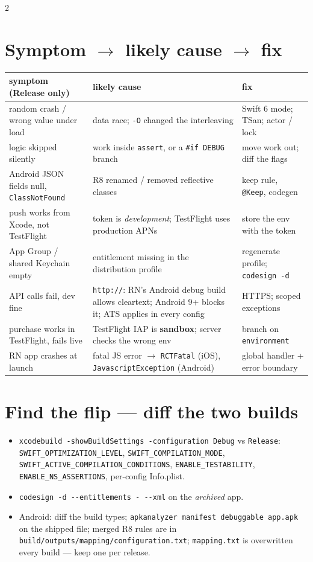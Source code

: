 \documentclass[8pt]{extarticle}
\newcommand\ct[1]{\texttt{#1}}
\newcommand\dd{\hbox{-}\hbox{-}}
\begin{document}
\begin{multicols}{2}
\section{Symptom $\to$ likely cause $\to$ fix}
{\footnotesize\setlength{\tabcolsep}{2.5pt}
\begin{tabular}{@{}>{\raggedright\arraybackslash}p{21mm}>{\raggedright\arraybackslash}p{34mm}>{\raggedright\arraybackslash}p{21mm}@{}}
\toprule
\textbf{symptom (Release only)} & \textbf{likely cause} & \textbf{fix}\\ \midrule
random crash / wrong value under load & data race; \ct{-O} changed the interleaving & Swift 6 mode; TSan; actor / lock\\
logic skipped silently & work inside \ct{assert}, or a \ct{\#if DEBUG} branch & move work out; diff the flags\\
Android JSON fields null, \ct{ClassNotFound} & R8 renamed / removed reflective classes & keep rule, \ct{@Keep}, codegen\\
push works from Xcode, not TestFlight & token is \emph{development}; TestFlight uses production APNs & store the env with the token\\
App Group / shared Keychain empty & entitlement missing in the distribution profile & regenerate profile; \ct{codesign -d}\\
API calls fail, dev fine & \ct{http://}: RN's Android debug build allows cleartext; Android 9+ blocks it; ATS applies in every config & HTTPS; scoped exceptions\\
purchase works in TestFlight, fails live & TestFlight IAP is \textbf{sandbox}; server checks the wrong env & branch on \ct{environment}\\
RN app crashes at launch & fatal JS error $\to$ \ct{RCTFatal} (iOS), \ct{JavascriptException} (Android) & global handler + error boundary\\
\bottomrule
\end{tabular}}

\section{Find the flip — diff the two builds}
\begin{itemize}
  \item \ct{xcodebuild -showBuildSettings -configuration Debug} vs \ct{Release}:
        \ct{SWIFT\_OPTIMIZATION\_LEVEL}, \ct{SWIFT\_COMPILATION\_MODE},
        \ct{SWIFT\_ACTIVE\_COMPILATION\_CONDITIONS}, \ct{ENABLE\_TESTABILITY},
        \ct{ENABLE\_NS\_ASSERTIONS}, per-config Info.plist.
  \item \ct{codesign -d \dd{}entitlements - \dd{}xml} on the \emph{archived} app.
  \item Android: diff the build types; \ct{apkanalyzer manifest debuggable app.apk} on the
        shipped file; merged R8 rules are in
        \ct{build/outputs/mapping/configuration.txt}; \ct{mapping.txt} is overwritten every
        build — keep one per release.
\end{itemize}


\end{multicols}
\end{document}
